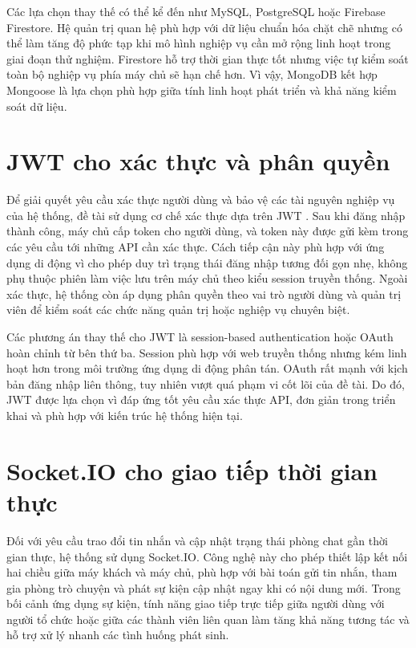 \documentclass[../DoAn.tex]{subfiles}
\begin{document}
Các lựa chọn thay thế có thể kể đến như MySQL, PostgreSQL hoặc Firebase Firestore. Hệ quản trị quan hệ phù hợp với dữ liệu chuẩn hóa chặt chẽ nhưng có thể làm tăng độ phức tạp khi mô hình nghiệp vụ cần mở rộng linh hoạt trong giai đoạn thử nghiệm. Firestore hỗ trợ thời gian thực tốt nhưng việc tự kiểm soát toàn bộ nghiệp vụ phía máy chủ sẽ hạn chế hơn. Vì vậy, MongoDB kết hợp Mongoose là lựa chọn phù hợp giữa tính linh hoạt phát triển và khả năng kiểm soát dữ liệu.

\section{JWT cho xác thực và phân quyền}
Để giải quyết yêu cầu xác thực người dùng và bảo vệ các tài nguyên nghiệp vụ của hệ thống, đề tài sử dụng cơ chế xác thực dựa trên \gls{JWT} \cite{jwt2026rfc}. Sau khi đăng nhập thành công, máy chủ cấp token cho người dùng, và token này được gửi kèm trong các yêu cầu tới những \gls{API} cần xác thực. Cách tiếp cận này phù hợp với ứng dụng di động vì cho phép duy trì trạng thái đăng nhập tương đối gọn nhẹ, không phụ thuộc phiên làm việc lưu trên máy chủ theo kiểu session truyền thống. Ngoài xác thực, hệ thống còn áp dụng phân quyền theo vai trò người dùng và quản trị viên để kiểm soát các chức năng quản trị hoặc nghiệp vụ chuyên biệt.

Các phương án thay thế cho JWT là session-based authentication hoặc OAuth hoàn chỉnh từ bên thứ ba. Session phù hợp với web truyền thống nhưng kém linh hoạt hơn trong môi trường ứng dụng di động phân tán. OAuth rất mạnh với kịch bản đăng nhập liên thông, tuy nhiên vượt quá phạm vi cốt lõi của đề tài. Do đó, JWT được lựa chọn vì đáp ứng tốt yêu cầu xác thực API, đơn giản trong triển khai và phù hợp với kiến trúc hệ thống hiện tại.

\section{Socket.IO cho giao tiếp thời gian thực}
Đối với yêu cầu trao đổi tin nhắn và cập nhật trạng thái phòng chat gần thời gian thực, hệ thống sử dụng Socket.IO. Công nghệ này cho phép thiết lập kết nối hai chiều giữa máy khách và máy chủ, phù hợp với bài toán gửi tin nhắn, tham gia phòng trò chuyện và phát sự kiện cập nhật ngay khi có nội dung mới. Trong bối cảnh ứng dụng sự kiện, tính năng giao tiếp trực tiếp giữa người dùng với người tổ chức hoặc giữa các thành viên liên quan làm tăng khả năng tương tác và hỗ trợ xử lý nhanh các tình huống phát sinh.
\end{document}
